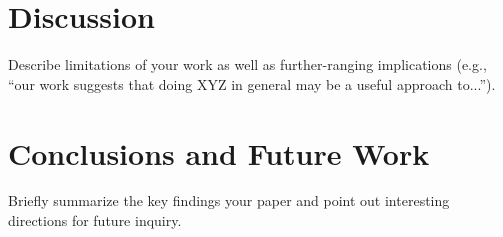 \documentclass{article}
\begin{document}
\section{Discussion}
Describe limitations of your work as well as further-ranging implications (e.g., ``our work suggests that doing XYZ in general may be a useful approach to...'').

\section{Conclusions and Future Work}
Briefly summarize the key findings your paper and point out interesting directions for future inquiry.



\end{document}
